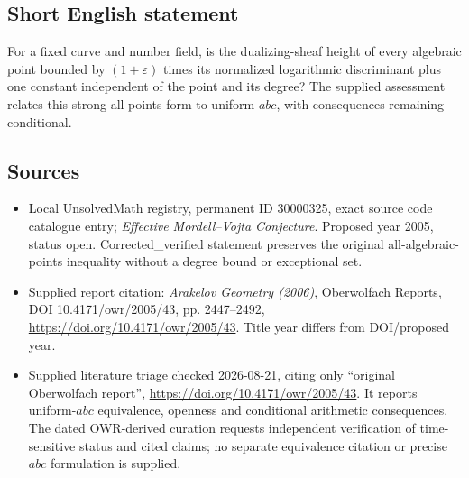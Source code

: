 \documentclass[11pt]{article}
\begin{document}
\subsection{Short English statement}
For a fixed curve and number field, is the dualizing-sheaf height of every algebraic point bounded by $(1+\varepsilon)$ times its normalized logarithmic discriminant plus one constant independent of the point and its degree? The supplied assessment relates this strong all-points form to uniform $abc$, with consequences remaining conditional.
\subsection{Sources}
\begin{itemize}
\item Local UnsolvedMath registry, permanent ID 30000325, exact source code catalogue entry; \emph{Effective Mordell--Vojta Conjecture}. Proposed year 2005, status open. Corrected\_verified statement preserves the original all-algebraic-points inequality without a degree bound or exceptional set.
\item Supplied report citation: \emph{Arakelov Geometry (2006)}, Oberwolfach Reports, DOI 10.4171/owr/2005/43, pp. 2447--2492, \url{https://doi.org/10.4171/owr/2005/43}. Title year differs from DOI/proposed year.
\item Supplied literature triage checked 2026-08-21, citing only ``original Oberwolfach report'', \url{https://doi.org/10.4171/owr/2005/43}. It reports uniform-$abc$ equivalence, openness and conditional arithmetic consequences. The dated OWR-derived curation requests independent verification of time-sensitive status and cited claims; no separate equivalence citation or precise $abc$ formulation is supplied.
\end{itemize}
\end{document}
